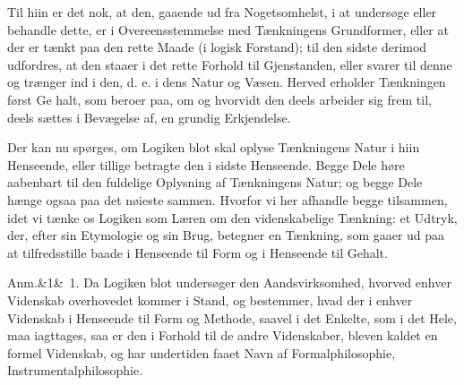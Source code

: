 \documentclass[12pt]{book}
\def\sperr#1{#1}%
\def\textit#1{#1}%
\def\emph#1{#1}%
\newcommand{\sperr}[1]{\textls[180]{#1}}
\newcommand{\anm}[1]{%
  \par\vspace{0.5\baselineskip}%
  \noindent\hspace{\parindent}\sperr{Anm.}\ifx&#1&\else~\textit{#1}.\fi
  \enspace\ignorespaces
}
\newcommand{\opage}[1]{\marginnote{\footnotesize\textit{[#1]}}}
\begin{document}
Til hiin er det nok, at den, gaaende ud fra Nogetsomhelst, i at undersøge
eller behandle dette, er i Overeensstemmelse med Tænkningens Grundformer,
eller at der er tænkt paa den rette \emph{Maade} (i logisk Forstand); til den
sidste derimod udfordres, at den staaer i det rette \emph{Forhold} til
Gjenstanden, eller svarer til denne og trænger ind i den, d. e. i dens Natur og
Væsen. Herved erholder Tænkningen først Ge%
\opage{7}halt, som beroer paa, om og hvorvidt den deels arbeider sig frem til, deels
sættes i Bevægelse af, en grundig Erkjendelse.

Der kan nu spørges, om Logiken blot skal oplyse Tænkningens Natur i hiin
Henseende, eller tillige betragte den i sidste Henseende. Begge Dele høre
aabenbart til den fuldelige Oplysning af Tænkningens Natur; og begge Dele
hænge ogsaa paa det nøieste sammen. Hvorfor vi her afhandle begge tilsammen,
idet vi tænke os Logiken som Læren om den videnskabelige Tænkning: et Udtryk,
der, efter sin Etymologie og sin Brug, betegner en Tænkning, som gaaer ud paa
at tilfredsstille baade i Henseende til Form og i Henseende til Gehalt.

\anm{1} Da Logiken blot undersøger den Aandsvirksomhed, hvorved enhver
Videnskab overhovedet kommer i Stand, og bestemmer, hvad der i enhver
Videnskab i Henseende til Form og Methode, saavel i det Enkelte, som i det
Hele, maa iagttages, saa er den i Forhold til de andre Videnskaber, bleven
kaldet en formel Videnskab, og har undertiden faaet Navn af
\emph{Formalphilosophie}, Instrumentalphilosophie.
\end{document}
